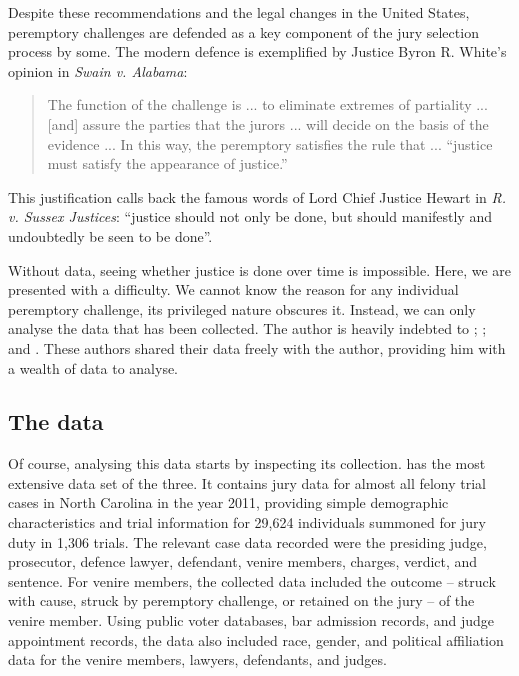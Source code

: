 \documentclass[12pt]{article}
\begin{document}
Despite these recommendations and the legal changes in the United States, peremptory challenges are defended as a key component of the jury selection process by some. The modern defence is exemplified by Justice Byron R. White's opinion in \emph{Swain v. Alabama}:

\begin{quote}
The function of the challenge is ... to eliminate extremes of partiality ... [and] assure the parties that the jurors ... will decide on the basis of the evidence ... In this way, the peremptory satisfies the rule that ... ``justice must satisfy the appearance of justice.''
\end{quote}

This justification calls back the famous words of Lord Chief Justice Hewart in \textit{R. v. Sussex Justices}: ``justice should not only be done, but should manifestly and undoubtedly be seen to be done''.

Without data, seeing whether justice is done over time is impossible. Here, we are presented with a difficulty. We cannot know the reason for any individual peremptory challenge, its privileged nature obscures it. Instead, we can only analyse the data that has been collected. The author is heavily indebted to \citeauthor{JurySunshineProj}; \citeauthor{StubbornLegacy}; and \citeauthor{PerempChalMurder}. These authors shared their data freely with the author, providing him with a wealth of data to analyse.

\subsection*{The data}

Of course, analysing this data starts by inspecting its collection. 
\cite{JurySunshineProj} has the most extensive data set of the three. It contains jury data for almost all felony trial cases in North Carolina in the year 2011, providing simple demographic characteristics and trial information for 29,624 individuals summoned for jury duty in 1,306 trials. The relevant case data recorded were the presiding judge, prosecutor, defence lawyer, defendant, venire members, charges, verdict, and sentence. For venire members, the collected data included the outcome -- struck with cause, struck by peremptory challenge, or retained on the jury -- of the venire member. Using public voter databases, bar admission records, and judge appointment records, the data also included race, gender, and political affiliation data for the venire members, lawyers, defendants, and judges.
\end{document}
